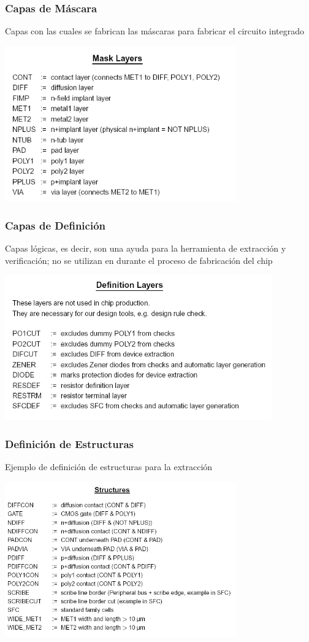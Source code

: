 \documentclass[aspectratio=169,10pt]{beamer}
\begin{document}
\begin{frame}[t]
\frametitle{Capas de Máscara}
Capas con las cuales se fabrican las máscaras para fabricar el circuito integrado

\centering
\includegraphics[width=10cm]{masks}
\end{frame}


\begin{frame}[t]
\frametitle{Capas de Definición}
Capas lógicas, es decir, son una ayuda para la herramienta de extracción y verificación; no se utilizan en durante el proceso de fabricación del chip

\centering
\includegraphics[width=11.5cm]{deflayers}
\end{frame}


\begin{frame}[t]
\frametitle{Definición de Estructuras}
Ejemplo de definición de estructuras para la extracción

\centering
\includegraphics[width=10cm]{structures}
\end{frame}
\end{document}
